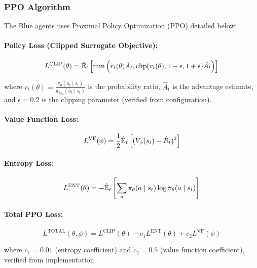 \documentclass[12pt,oneside]{article}
\begin{document}
\subsubsection{PPO Algorithm}

The Blue agents uses Proximal Policy Optimization (PPO) detailed below:

\paragraph{Policy Loss (Clipped Surrogate Objective):}
\begin{equation}
L^{\text{CLIP}}(\theta) = \hat{\mathbb{E}}_t\left[\min\left(r_t(\theta)\hat{A}_t, \text{clip}(r_t(\theta), 1-\epsilon, 1+\epsilon)\hat{A}_t\right)\right]
\end{equation}

where $r_t(\theta) = \frac{\pi_\theta(a_t \mid s_t)}{\pi_{\theta_{\text{old}}}(a_t \mid s_t)}$ is the probability ratio, $\hat{A}_t$ is the advantage estimate, and $\epsilon = 0.2$ is the clipping parameter (verified from configuration).

\paragraph{Value Function Loss:}
\begin{equation}
L^{\text{VF}}(\phi) = \frac{1}{2}\hat{\mathbb{E}}_t\left[(V_\phi(s_t) - \hat{R}_t)^2\right]
\end{equation}

\paragraph{Entropy Loss:}
\begin{equation}
L^{\text{ENT}}(\theta) = -\hat{\mathbb{E}}_t\left[\sum_a \pi_\theta(a \mid s_t) \log \pi_\theta(a \mid s_t)\right]
\end{equation}

\paragraph{Total PPO Loss:}
\begin{equation}
L^{\text{TOTAL}}(\theta, \phi) = L^{\text{CLIP}}(\theta) - c_1 L^{\text{ENT}}(\theta) + c_2 L^{\text{VF}}(\phi)
\end{equation}

where $c_1 = 0.01$ (entropy coefficient) and $c_2 = 0.5$ (value function coefficient), verified from implementation.
\end{document}

